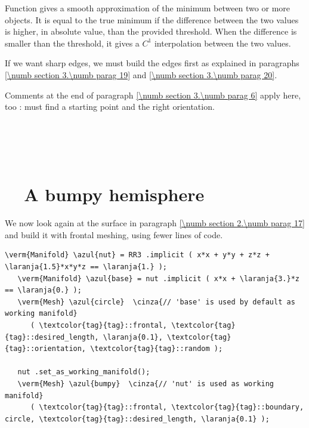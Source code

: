 Function {\small\tt{}} gives a smooth approximation of the minimum between
two or more {\small\tt{}} objects.
It is equal to the true minimum if the difference between the two values is higher, in
absolute value, than the provided threshold.
When the difference is smaller than the threshold, it gives a $ C^1 $ interpolation between
the two values.

If we want sharp edges, we must build the edges first as explained in paragraphs
\ref{\numb section 3.\numb parag 19} and \ref{\numb section 3.\numb parag 20}.

Comments at the end of paragraph \ref{\numb section 3.\numb parag 6} apply here, too :
{\maniFEM} must find a starting point and the right orientation.


\section{~~\cinzasec{[empty]}}\label{\numb section 3.\numb parag 8}


\section{~~A bumpy hemisphere}\label{\numb section 3.\numb parag 9}

We now look again at the surface in paragraph \ref{\numb section 2.\numb parag 17}
and build it with frontal meshing, using fewer lines of code.

\begin{Verbatim}[commandchars=\\\{\},formatcom=\small\tt,frame=single,
   label=parag-\ref{\numb section 3.\numb parag 9}.cpp,rulecolor=\color{moldura},
   baselinestretch=0.94,framesep=2mm                                            ]
   \verm{Manifold} \azul{nut} = RR3 .implicit ( x*x + y*y + z*z + \laranja{1.5}*x*y*z == \laranja{1.} );
   \verm{Manifold} \azul{base} = nut .implicit ( x*x + \laranja{3.}*z == \laranja{0.} );
   \verm{Mesh} \azul{circle}  \cinza{// 'base' is used by default as working manifold}
      ( \textcolor{tag}{tag}::frontal, \textcolor{tag}{tag}::desired_length, \laranja{0.1}, \textcolor{tag}{tag}::orientation, \textcolor{tag}{tag}::random );
   
   nut .set_as_working_manifold();
   \verm{Mesh} \azul{bumpy}  \cinza{// 'nut' is used as working manifold}
      ( \textcolor{tag}{tag}::frontal, \textcolor{tag}{tag}::boundary, circle, \textcolor{tag}{tag}::desired_length, \laranja{0.1} );
\end{Verbatim}

